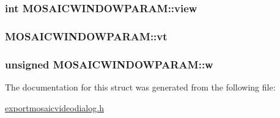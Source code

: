 \hypertarget{struct_m_o_s_a_i_c_w_i_n_d_o_w_p_a_r_a_m_35eb3c52f7b9c134bf8d8431301ddf28}{
\subsubsection[{view}]{\setlength{\rightskip}{0pt plus 5cm}int {\bf MOSAICWINDOWPARAM::view}}}
\label{struct_m_o_s_a_i_c_w_i_n_d_o_w_p_a_r_a_m_35eb3c52f7b9c134bf8d8431301ddf28}


\hypertarget{struct_m_o_s_a_i_c_w_i_n_d_o_w_p_a_r_a_m_1ec63476fd857df5cb006bd9e97f4cd5}{
\subsubsection[{vt}]{ {\bf MOSAICWINDOWPARAM::vt}}}
\label{struct_m_o_s_a_i_c_w_i_n_d_o_w_p_a_r_a_m_1ec63476fd857df5cb006bd9e97f4cd5}


\hypertarget{struct_m_o_s_a_i_c_w_i_n_d_o_w_p_a_r_a_m_dfd1ee1bdbc96d96b0c5b4744bf25a22}{
\subsubsection[{w}]{\setlength{\rightskip}{0pt plus 5cm}unsigned {\bf MOSAICWINDOWPARAM::w}}}
\label{struct_m_o_s_a_i_c_w_i_n_d_o_w_p_a_r_a_m_dfd1ee1bdbc96d96b0c5b4744bf25a22}




The documentation for this struct was generated from the following file:\begin{CompactItemize}
\item 
\hyperlink{exportmosaicvideodialog_8h}{exportmosaicvideodialog.h}\end{CompactItemize}
